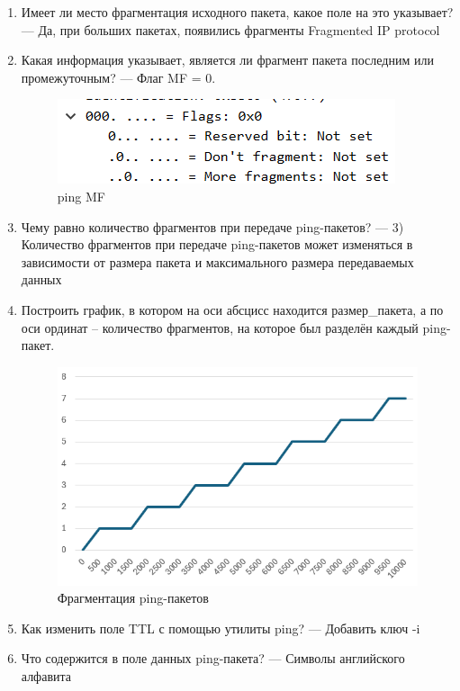 \begin{enumerate}
    \item Имеет ли место фрагментация исходного пакета, какое поле на это 
указывает? --- Да, при больших пакетах, появились фрагменты Fragmented IP protocol
    \item Какая информация указывает, является ли фрагмент пакета последним 
или промежуточным? --- Флаг MF = 0.
        \begin{figure}[H]
            \centering
            \includegraphics[width=0.5\linewidth]{res/ping-mf.png}
            \caption{ping MF}
            \label{fig:ping-mf}
        \end{figure}
    \item Чему равно количество фрагментов при передаче ping-пакетов? --- 3)	Количество фрагментов при передаче ping-пакетов может изменяться в зависимости от размера пакета и максимального размера передаваемых данных
    \item Построить график, в котором на оси абсцисс находится размер\_пакета, а 
по оси ординат – количество фрагментов, на которое был разделён 
каждый ping-пакет.
        \begin{figure}[H]
            \centering
            \includegraphics[width=0.75\linewidth]{res/ping-fragmentation.png}
            \caption{Фрагментация ping-пакетов}
            \label{fig:ping-fragmantation}
        \end{figure}
    \item Как изменить поле TTL с помощью утилиты ping? --- Добавить ключ -i
    \item Что содержится в поле данных ping-пакета? --- Символы английского алфавита
\end{enumerate}

